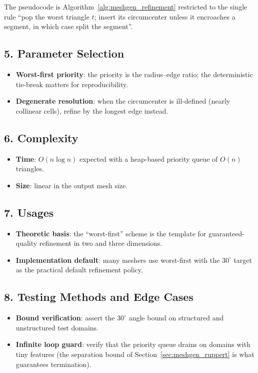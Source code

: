 The pseudocode is Algorithm~\ref{alg:meshgen_refinement} restricted to the
single rule ``pop the worst triangle $t$; insert its circumcenter unless it
encroaches a segment, in which case split the segment''.

\subsection{5. Parameter Selection}

\begin{itemize}
\item \textbf{Worst-first priority}: the priority is the radius--edge
  ratio; the deterministic tie-break matters for reproducibility.
\item \textbf{Degenerate resolution}: when the circumcenter is ill-defined
  (nearly collinear cells), refine by the longest edge instead.
\end{itemize}

\subsection{6. Complexity}

\begin{itemize}
\item \textbf{Time}: $O(n \log n)$ expected with a heap-based priority
  queue of $O(n)$ triangles.
\item \textbf{Size}: linear in the output mesh size.
\end{itemize}

\subsection{7. Usages}

\begin{itemize}
\item \textbf{Theoretic basis}: the ``worst-first'' scheme is the template
  for guaranteed-quality refinement in two and three dimensions.
\item \textbf{Implementation default}: many meshers use worst-first with
  the $30^\circ$ target as the practical default refinement policy.
\end{itemize}

\subsection{8. Testing Methods and Edge Cases}

\begin{itemize}
\item \textbf{Bound verification}: assert the $30^\circ$ angle bound on
  structured and unstructured test domains.
\item \textbf{Infinite loop guard}: verify that the priority queue drains on
  domains with tiny features (the separation bound of
  Section~\ref{sec:meshgen_ruppert} is what guarantees termination).
\end{itemize}

